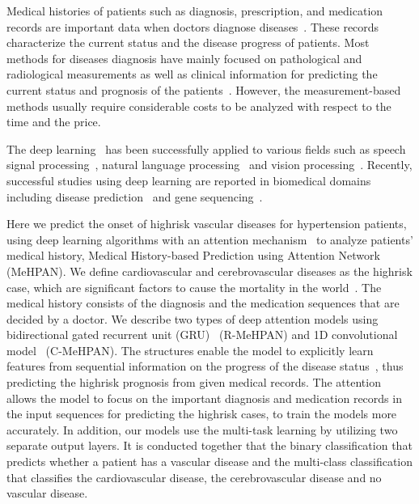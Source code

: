 \documentclass{article}
\newcommand{\todoc}[2]{{\textcolor{#1}{\textbf{[#2]}}}}
\newcommand{\todogreen}[1]{\todoc{green}{\textbf{#1}}}
\newcommand{\jwha}[1]{\todogreen{JW: #1}}
\begin{document}
Medical histories of patients such as diagnosis, prescription, and medication records are important data when doctors diagnose diseases~\cite{Summerton273}. These records characterize the current status and the disease progress of patients. 
Most methods for diseases diagnosis have mainly focused on pathological and radiological measurements as well as clinical information for predicting the current status and prognosis of the patients~\cite{lung_cnn, thorax_cnn}. However, the measurement-based methods usually require considerable costs to be analyzed with respect to the time and the price. 


The deep learning~\cite{lecun2015deep} has been successfully applied to various fields such as speech signal processing~\cite{arik2017deep, amodei2016deep}, natural language processing~\cite{lin2017structured, gehring2017convolutional} and vision processing~\cite{huang2016densely, redmon2016yolo9000}. Recently, successful studies using deep learning are reported in biomedical domains including disease prediction~\cite{NIPS2016_6321} and gene sequencing~\cite{umarov2017recognition}.

Here we predict the onset of highrisk vascular diseases for hypertension patients, using deep learning algorithms with an attention mechanism~\cite{xu2015show} to analyze patients' medical history, Medical History-based Prediction using Attention Network (MeHPAN). We define cardiovascular and cerebrovascular diseases as the highrisk case, which are significant factors to cause the mortality in the world~\cite{lozano2012global}.
The medical history consists of the diagnosis and the medication sequences that are decided by a doctor. We describe two types of deep attention models using bidirectional gated recurrent unit (GRU)~\cite{chung2014empirical} (R-MeHPAN) and 1D convolutional model~\cite{kim2014convolutional} (C-MeHPAN). The structures enable the model to explicitly learn features from sequential information on the progress of the disease status~\cite{gehring2017convolutional, sutskever2014sequence}, thus predicting the highrisk prognosis from given medical records.
The attention allows the model to focus on the important diagnosis and medication records in the input sequences for predicting the highrisk cases, to train the models more accurately. 
In addition, our models use the multi-task learning by utilizing two separate output layers. 
It is conducted together that the binary classification that predicts whether a patient has a vascular disease and the multi-class classification that classifies the cardiovascular disease, the cerebrovascular disease and no vascular disease.   
\end{document}

